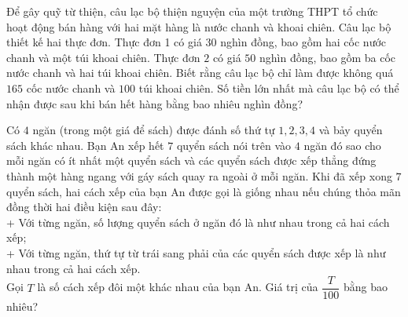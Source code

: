 \documentclass[12pt,a4paper]{article}
\begin{document}
\begin{ex}%
Để gây quỹ từ thiện, câu lạc bộ thiện nguyện của một trường THPT tổ chức hoạt động bán hàng với hai mặt hàng là nước chanh và khoai chiên. Câu lạc bộ thiết kế hai thực đơn. Thực đơn 1 có giá $30$ nghìn đồng, bao gồm hai cốc nước chanh và một túi khoai chiên. Thực đơn $2$ có giá $50$ nghìn đồng, bao gồm ba cốc nước chanh và hai túi khoai chiên. Biết rằng câu lạc bộ chỉ làm được không quá $165$ cốc nước chanh và $100$ túi khoai chiên. Số tiền lớn nhất mà câu lạc bộ có thể nhận được sau khi bán hết hàng bằng bao nhiêu nghìn đồng?
\end{ex}

\begin{ex}%
Có $4$ ngăn (trong một giá để sách) được đánh số thứ tự $1,2,3,4$ và bảy quyển sách khác nhau. Bạn An xếp hết $7$ quyển sách nói trên vào $4$ ngăn đó sao cho mỗi ngăn có ít nhất một quyển sách và các quyển sách được xếp thẳng đứng thành một hàng ngang với gáy sách quay ra ngoài ở mỗi ngăn. Khi đã xếp xong $7$ quyển sách, hai cách xếp của bạn An được gọi là giống nhau nếu chúng thỏa mãn đồng thời hai điều kiện sau đây:\\
+ Với từng ngăn, số lượng quyển sách ở ngăn đó là như nhau trong cả hai cách xếp;\\
+ Với từng ngăn, thứ tự từ trái sang phải của các quyển sách được xếp là như nhau trong cả hai cách xếp.\\
Gọi $T$ là số cách xếp đôi một khác nhau của bạn An. Giá trị của $\dfrac{T}{100}$ bằng bao nhiêu?
\end{ex}
\end{document}
